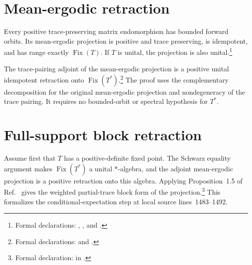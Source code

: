 \documentclass{article}
\begin{document}
\section{Mean-ergodic retraction}

Every positive trace-preserving matrix endomorphism has bounded forward
orbits. Its mean-ergodic projection is positive and trace preserving, is
idempotent, and has range exactly $\operatorname{Fix}(T)$. If $T$ is unital,
the projection is also unital.\footnote{Formal declarations:
,
, and
.}

The trace-pairing adjoint of the mean-ergodic projection is a positive unital
idempotent retraction onto $\operatorname{Fix}(T^*)$.\footnote{Formal
declarations:
and
.}
The proof uses the complementary decomposition for the original mean-ergodic
projection and nondegeneracy of the trace pairing. It requires no
bounded-orbit or spectral hypothesis for $T^*$.

\section{Full-support block retraction}

Assume first that $T$ has a positive-definite fixed point. The Schwarz equality
argument makes $\operatorname{Fix}(T^*)$ a unital $*$-algebra, and the adjoint
mean-ergodic projection is a positive retraction onto this algebra. Applying
Proposition~1.5 of Ref.~\cite{Wolf2012Quantum} gives the weighted
partial-trace block form of the projection.\footnote{Formal declaration:
in
.}
This formalizes the conditional-expectation step at local source
lines~1483--1492.
\end{document}
